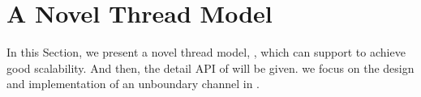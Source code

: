 \section{A Novel Thread Model}
\label{sec:design}
In this Section, we present a novel thread model, \myth, which can support \myds to achieve good scalability.
And then, the detail API of \myth will be given.
we focus on the design and implementation of an unboundary channel in \myth.


%
